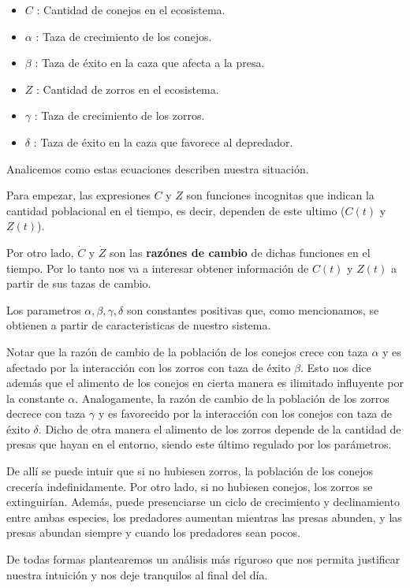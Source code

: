 \documentclass[10pt,journal,compsoc]{IEEEtran}
\begin{document}
 \begin{itemize}
   \item $C$ : Cantidad de conejos en el ecosistema.
   \item $\alpha$ : Taza de crecimiento de los conejos.
   \item $\beta$ : Taza de éxito en la caza que afecta a la presa.
   \item $Z$ : Cantidad de zorros en el ecosistema.
   \item $\gamma$ : Taza de crecimiento de los zorros.
   \item $\delta$ : Taza de éxito en la caza que favorece al depredador.
 \end{itemize}

 Analicemos como estas ecuaciones describen nuestra situación.
 
 Para empezar, las expresiones $C$ y $Z$ son funciones incognitas que indican la
 cantidad poblacional en el tiempo, es decir, dependen de este ultimo ($C(t)$ y
 $Z(t)$).

 Por otro lado, $\dot C$ y $\dot Z$ son las \textbf{razónes de cambio} de dichas
 funciones en el tiempo. Por lo tanto nos va a interesar obtener información de
 $C(t)$ y $Z(t)$ a partir de sus tazas de cambio.

 Los parametros $\alpha, \beta, \gamma, \delta$ son constantes positivas que,
 como mencionamos, se obtienen a partir de caracteristicas de nuestro sistema.

 Notar que la razón de cambio de la población de los conejos crece con taza
 $\alpha$ y es afectado por la interacción con los zorros con taza de éxito
 $\beta$. Esto nos dice además que el alimento de los conejos en cierta manera
 es ilimitado influyente por la constante $\alpha$. Analogamente, la razón de
 cambio de la población de los zorros decrece con taza $\gamma$ y es favorecido
 por la interacción con los conejos con taza de éxito $\delta$. Dicho de otra
 manera el alimento de los zorros depende de la cantidad de presas que hayan en
 el entorno, siendo este último regulado por los parámetros.

 De allí se puede intuir que si no hubiesen zorros, la población de los conejos
 crecería indefinidamente. Por otro lado, si no hubiesen conejos, los zorros se
 extinguirían. Además, puede presenciarse un ciclo de crecimiento y
 declinamiento entre ambas especies, los predadores aumentan mientras las presas
 abunden, y las presas abundan siempre y cuando los predadores sean pocos.
 
 De todas formas plantearemos un análisis más riguroso que nos permita
 justificar nuestra intuición y nos deje tranquilos al final del día.
\end{document}
